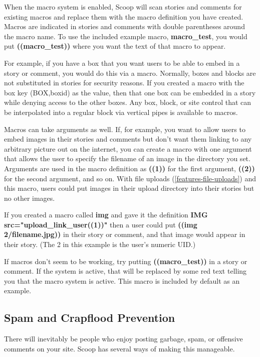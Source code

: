 When the macro system is enabled, Scoop will scan stories and comments for existing macros and replace them with the macro definition you have created. Macros are indicated in stories and comments with double parentheses around the macro name. To use the included example macro, {\bf macro\_test}, you would put {\bf ((macro\_test))} where you want the text of that macro to appear.

For example, if you have a box that you want users to be able to embed in a story or comment, you would do this via a macro. Normally, boxes and blocks are not substituted in stories for security reasons. If you created a macro with the box key (\latexhtml{$\vert$}{|}BOX,boxid\latexhtml{$\vert$}{|}) as the value, then that one box can be embedded in a story while denying access to the other boxes. Any box, block, or site control that can be interpolated into a regular block via vertical pipes is available to macros.

Macros can take arguments as well. If, for example, you want to allow users to embed images in their stories and comments but don't want them linking to any arbitrary picture out on the internet, you can create a macro with one argument that allows the user to specify the filename of an image in the directory you set. Arguments are used in the macro definition as {\bf ((1))} for the first argument, {\bf ((2))} for the second argument, and so on. With file uploads (\ref{features-file-uploads}) and this macro, users could put images in their upload directory into their stories but no other images.

If you created a macro called {\bf img} and gave it the definition {\bf \latexhtml{$<$}{<}IMG src="\latexhtml{$\vert$}{|}upload\_link\_user\latexhtml{$\vert$}{|}((1))"\latexhtml{$>$}{>}} then a user could put {\bf ((img 2/filename.jpg))} in their story or comment, and that image would appear in their story. (The 2 in this example is the user's numeric UID.)

If macros don't seem to be working, try putting {\bf ((macro\_test))} in a story or comment. If the system is active, that will be replaced by some red text telling you that the macro system is active. This macro is included by default as an example.

\subsection{Spam and Crapflood Prevention}
\label{features-anti-spam}

There will inevitably be people who enjoy posting garbage, spam, or offensive comments on your site.  Scoop has several ways of making this manageable.


